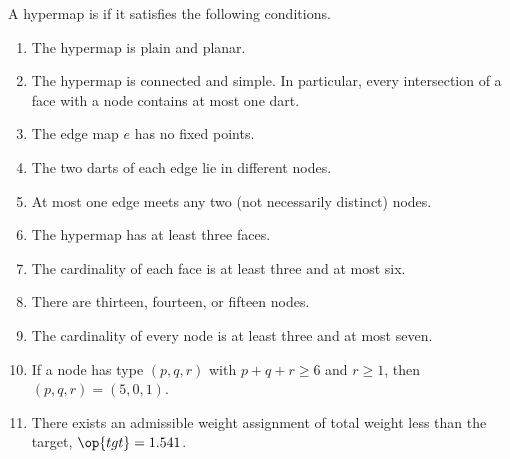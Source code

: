\begin{definition}[tame]\label{definition:tame}
A hypermap is  if it satisfies the following conditions.
%
%
\begin{enumerate}\wasitemize 
\item {}  
The hypermap is plain and planar.
\item {} 
The hypermap is connected and simple.  In
  particular, every intersection of a face with a node contains at
  most one dart.
\item {} 
The edge map $e$ has no fixed points.
\item {} 
The two darts of each edge lie in different nodes.
\item {} 
At most one edge meets any two (not necessarily distinct) nodes.
\item {} 
  The hypermap has at least three faces.
\item {}
The cardinality of each face is at least three  and at most six.
\item {} 
There are  thirteen, fourteen, or fifteen nodes.
\item {} 
The cardinality of every node is at least three
  and at most seven.
\item {} 
If a node has type $(p,q,r)$ with $p+q+r\ge 6$ and $r\ge 1$, then $(p,q,r)=(5,0,1)$. 
\item {} 
There exists an admissible weight assignment
of total weight less than the target, $\op{tgt}=1.541$.
\end{enumerate}\wasitemize 
\end{definition}
%
%
%
%
%
%
%
%


